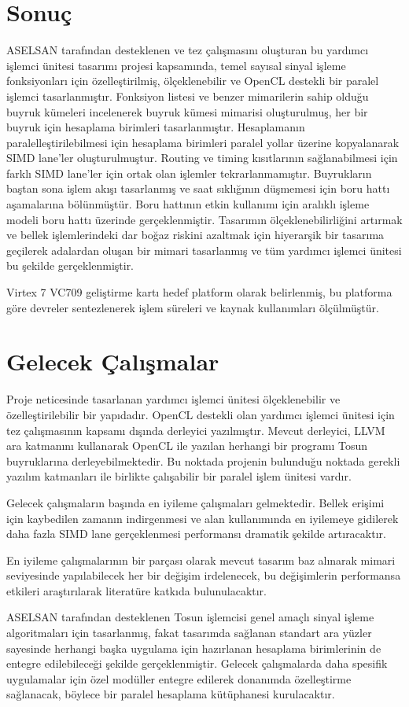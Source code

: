 \section{Sonuç}
ASELSAN tarafından desteklenen ve tez çalışmasını oluşturan bu yardımcı işlemci ünitesi tasarımı projesi kapsamında, temel sayısal sinyal işleme fonksiyonları için özelleştirilmiş, ölçeklenebilir ve OpenCL destekli bir paralel işlemci tasarlanmıştır. Fonksiyon listesi ve benzer mimarilerin sahip olduğu buyruk kümeleri incelenerek buyruk kümesi mimarisi oluşturulmuş, her bir buyruk için hesaplama birimleri tasarlanmıştır. Hesaplamanın paralelleştirilebilmesi için hesaplama birimleri paralel yollar üzerine kopyalanarak SIMD lane'ler oluşturulmuştur. Routing ve timing kısıtlarının sağlanabilmesi için farklı SIMD lane'ler için ortak olan işlemler tekrarlanmamıştır. Buyrukların baştan sona işlem akışı tasarlanmış ve saat sıklığının düşmemesi için boru hattı aşamalarına bölünmüştür. Boru hattının etkin kullanımı için aralıklı işleme modeli boru hattı üzerinde gerçeklenmiştir. Tasarımın ölçeklenebilirliğini artırmak ve bellek işlemlerindeki dar boğaz riskini azaltmak için hiyerarşik bir tasarıma geçilerek adalardan oluşan bir mimari tasarlanmış ve tüm yardımcı işlemci ünitesi bu şekilde gerçeklenmiştir. \par

Virtex 7 VC709 geliştirme kartı hedef platform olarak belirlenmiş, bu platforma göre devreler sentezlenerek işlem süreleri ve kaynak kullanımları ölçülmüştür.

\section{Gelecek Çalışmalar}
Proje neticesinde tasarlanan yardımcı işlemci ünitesi ölçeklenebilir ve özelleştirilebilir bir yapıdadır. OpenCL destekli olan yardımcı işlemci ünitesi için tez çalışmasının kapsamı dışında derleyici yazılmıştır. Mevcut derleyici, LLVM ara katmanını kullanarak OpenCL ile yazılan herhangi bir programı Tosun buyruklarına derleyebilmektedir. Bu noktada projenin bulunduğu noktada gerekli yazılım katmanları ile birlikte çalışabilir bir paralel işlem ünitesi vardır.\par
Gelecek çalışmaların başında en iyileme çalışmaları gelmektedir. Bellek erişimi için kaybedilen zamanın indirgenmesi ve alan kullanımında en iyilemeye gidilerek daha fazla SIMD lane gerçeklenmesi performansı dramatik şekilde artıracaktır.\par En iyileme çalışmalarının bir parçası olarak mevcut tasarım baz alınarak mimari seviyesinde yapılabilecek her bir değişim irdelenecek, bu değişimlerin performansa etkileri araştırılarak literatüre katkıda bulunulacaktır. \par
ASELSAN tarafından desteklenen Tosun işlemcisi genel amaçlı sinyal işleme algoritmaları için tasarlanmış, fakat tasarımda sağlanan standart ara yüzler sayesinde herhangi başka uygulama için hazırlanan hesaplama birimlerinin de entegre edilebileceği şekilde gerçeklenmiştir. Gelecek çalışmalarda daha spesifik uygulamalar için özel modüller entegre edilerek donanımda özelleştirme sağlanacak, böylece bir paralel hesaplama kütüphanesi kurulacaktır.  